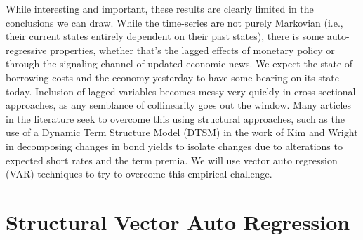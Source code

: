 \documentclass[12pt,final]{article}
\begin{document}
While interesting and important, these results are clearly limited in the conclusions we can draw. While the time-series are not purely Markovian (i.e., their current states entirely dependent on their past states), there is some auto-regressive properties, whether that's the lagged effects of monetary policy or through the signaling channel of updated economic news. We expect the state of borrowing costs and the economy yesterday to have some bearing on its state today. Inclusion of lagged variables becomes messy very quickly in cross-sectional approaches, as any semblance of collinearity goes out the window. Many articles in the literature seek to overcome this using structural approaches, such as the use of a Dynamic Term Structure Model (DTSM) in the work of Kim and Wright in decomposing changes in bond yields to isolate changes due to alterations to expected short rates and the term premia. \citep{Kim2005} We will use vector auto regression (VAR) techniques to try to overcome this empirical challenge.

\section{Structural Vector Auto Regression}
\end{document}
